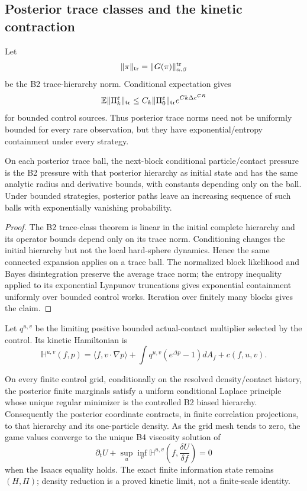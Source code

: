 \subsection{Posterior trace classes and the kinetic contraction}

Let
\[
\|\pi\|_{\rm tr}=\|G(\pi)\|_{\alpha,\beta}^{\rm tr}
\]
be the B2 trace-hierarchy norm.  Conditional expectation gives
\[
\mathbb E\|\Pi_k^\varepsilon\|_{\rm tr}
\le C_k\|\Pi_0^\varepsilon\|_{\rm tr}e^{Ck\Delta e^{CR}}
\]
for bounded control sources.  Thus posterior trace norms need not be uniformly
bounded for every rare observation, but they have exponential/entropy
containment under every strategy.

\begin{lemma}
\label{lem:r6-c1-source}
On each posterior trace ball, the next-block conditional particle/contact
pressure is the B2 pressure with that posterior hierarchy as initial state and
has the same analytic radius and derivative bounds, with constants depending
only on the ball.  Under bounded strategies, posterior paths leave an
increasing sequence of such balls with exponentially vanishing probability.
\end{lemma}

\begin{proof}
The B2 trace-class theorem is linear in the initial complete hierarchy and its
operator bounds depend only on its trace norm.  Conditioning changes the
initial hierarchy but not the local hard-sphere dynamics.  Hence the same
connected expansion applies on a trace ball.  The normalized block likelihood
and Bayes disintegration preserve the average trace norm; the entropy
inequality applied to its exponential Lyapunov truncations gives exponential
containment uniformly over bounded control works.  Iteration over finitely
many blocks gives the claim.
\end{proof}

Let \(q^{u,v}\) be the limiting positive bounded actual-contact multiplier
selected by the control.  Its kinetic Hamiltonian is
\[
\mathbb H^{u,v}(f,p)=
\langle f,v\cdot\nabla p\rangle+
\int q^{u,v}(e^{\Delta p}-1)dA_f+c(f,u,v).
\]

\begin{theorem}
\label{thm:r6-c1-contraction}
On every finite control grid, conditionally on the resolved density/contact
history, the posterior finite marginals satisfy a uniform conditional Laplace
principle whose unique regular minimizer is the controlled B2 biased hierarchy.
Consequently the posterior coordinate contracts, in finite correlation
projections, to that hierarchy and its one-particle density.  As the grid mesh
tends to zero, the game values converge to the unique B4 viscosity solution of
\[
\partial_tU+\sup_u\inf_v
\mathbb H^{u,v}
\left(f,\frac{\delta U}{\delta f}\right)=0
\]
when the Isaacs equality holds.  The exact finite information state remains
\((H,\Pi)\); density reduction is a proved kinetic limit, not a finite-scale
identity.
\end{theorem}

